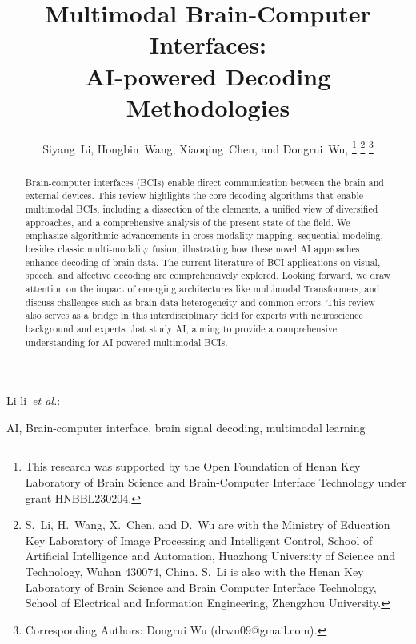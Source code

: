 \documentclass[journal]{IEEEtran}
\begin{document}
\title{Multimodal Brain-Computer Interfaces:\\ AI-powered Decoding Methodologies}

\author{Siyang~Li, Hongbin~Wang, Xiaoqing~Chen, and Dongrui~Wu, 
\thanks{This research was supported by the Open Foundation of Henan Key Laboratory of Brain Science and Brain-Computer Interface Technology under grant HNBBL230204.}
\thanks{S.~Li, H.~Wang, X.~Chen, and D.~Wu are with the Ministry of Education Key Laboratory of Image Processing and Intelligent Control, School of Artificial Intelligence and Automation, Huazhong University of Science and Technology, Wuhan 430074, China. S.~Li is also with the Henan Key Laboratory of Brain Science and Brain Computer Interface Technology, School of Electrical and Information Engineering, Zhengzhou University.}
\thanks{Corresponding Authors: Dongrui Wu (drwu09@gmail.com).}}

{Li \MakeLowercase{Li~\emph{et al.}}: }
\maketitle

\begin{abstract}
Brain-computer interfaces (BCIs) enable direct communication between the brain and external devices. This review highlights the core decoding algorithms that enable multimodal BCIs, including a dissection of the elements, a unified view of diversified approaches, and a comprehensive analysis of the present state of the field. We emphasize algorithmic advancements in cross-modality mapping, sequential modeling, besides classic multi-modality fusion, illustrating how these novel AI approaches enhance decoding of brain data. The current literature of BCI applications on visual, speech, and affective decoding are comprehensively explored. Looking forward, we draw attention on the impact of emerging architectures like multimodal Transformers, and discuss challenges such as brain data heterogeneity and common errors. This review also serves as a bridge in this interdisciplinary field for experts with neuroscience background and experts that study AI, aiming to provide a comprehensive understanding for AI-powered multimodal BCIs.
\end{abstract}

\begin{IEEEkeywords}
AI, Brain-computer interface, brain signal decoding, multimodal learning
\end{IEEEkeywords}
\end{document}
